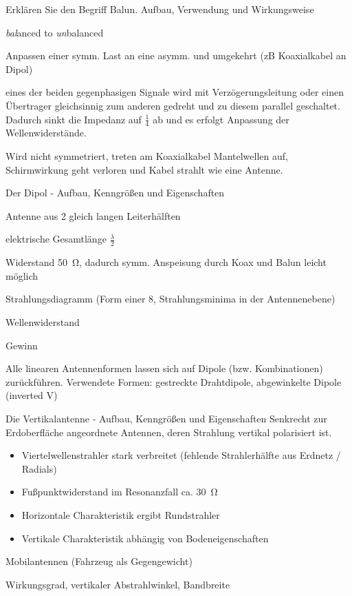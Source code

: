 \documentclass[avery5371,grid,frame,a4paper]{flashcards}
\newcommand{\card}[3]{
  \begin{flashcard}[{\chap} -- #1]{#2}#3\end{flashcard}
}
\begin{document}
\card{63}{Erklären Sie den Begriff Balun. Aufbau, Verwendung und Wirkungsweise}{
  \small
  \begin{description}\itemsep-1pt
    \item[Balun] \emph{bal}anced to \emph{un}balanced
    \item[Verwendung]
      Anpassen einer symm. Last an eine asymm. und umgekehrt
      (zB Koaxialkabel an Dipol)
    \item[Wirkungsweise]
      eines der beiden gegenphasigen Signale wird mit Verzögerungsleitung oder einen Übertrager gleichsinnig zum anderen gedreht und zu diesem parallel geschaltet. Dadurch sinkt die Impedanz auf $\frac14$ ab und es erfolgt Anpassung der Wellenwiderstände.
  \end{description}
  Wird nicht symmetriert, treten am Koaxialkabel Mantelwellen auf, Schirmwirkung geht verloren und Kabel strahlt wie eine Antenne.
}
\card{64}{Der Dipol - Aufbau, Kenngrößen und Eigenschaften}{
  \small
  \begin{description}\itemsep0pt
    \item[Dipol] Antenne aus 2 gleich langen Leiterhälften
    \item[Halbwellendipol] elektrische Gesamtlänge $\frac\lambda2$
    \item[Mittige Anspeisung]
      Widerstand \SI{50}{\ohm},
      dadurch symm. Anspeisung durch Koax und Balun leicht möglich
    \item[Kenngrößen]
      \begin{itemize*}\itemsep0pt
        \item Strahlungsdiagramm (Form einer 8, Strahlungsminima in der Antennenebene)
        \item Wellenwiderstand
        \item Gewinn
      \end{itemize*}
  \end{description}
  Alle linearen Antennenformen lassen sich auf Dipole (bzw. Kombinationen) zurückführen.
  Verwendete Formen: gestreckte Drahtdipole, abgewinkelte Dipole (inverted V)
}
\card{65}{Die Vertikalantenne - Aufbau, Kenngrößen und Eigenschaften}{
  \footnotesize
  Senkrecht zur Erdoberfläche angeordnete Antennen, deren Strahlung vertikal polarisiert ist.

  \begin{itemize}\itemsep0pt
    \item Viertelwellenstrahler stark verbreitet (fehlende Strahlerhälfte aus Erdnetz / Radials)
    \item Fußpunktwiderstand im Resonanzfall ca. \SI{30}{\ohm}
    \item Horizontale Charakteristik ergibt Rundstrahler
    \item Vertikale Charakteristik abhängig von Bodeneigenschaften
  \end{itemize}
  \begin{description}
    \itemsep0pt
    \item[Verwendung] Mobilantennen (Fahrzeug als Gegengewicht)
    \item[Kenngrößen] Wirkungsgrad, vertikaler Abstrahlwinkel, Bandbreite
  \end{description}
}
\end{document}
